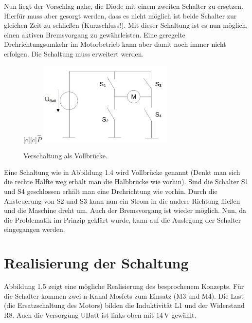 Nun liegt der Vorschlag nahe, die Diode mit einem zweiten Schalter zu ersetzen. Hierfür muss aber gesorgt werden, dass es nicht möglich ist beide Schalter zur gleichen Zeit zu schließen (Kurzschluss!). Mit dieser Schaltung ist es nun möglich, einen aktiven Bremsvorgang zu gewährleisten. Eine geregelte Drehrichtungsumkehr im Motorbetrieb kann aber damit noch immer nicht erfolgen. Die Schaltung muss erweitert werden.

\begin{figure}[H]
	\renewcommand{\figurename}{Abbildung}
	\centering	
	\psfragscanon		
	[c]{$\hat{P}$}
	\includegraphics[width=0.6\textwidth,angle=0]{Bilder/4.jpg}		
	\caption{Verschaltung als Vollbrücke.}
	\label{ME}
\end{figure}

Eine Schaltung wie in Abbildung 1.4 wird Vollbrücke genannt (Denkt man sich die rechte Hälfte weg erhält man die Halbbrücke wie vorhin). Sind die Schalter S1 und S4 geschlossen erhält man eine Drehrichtung wie vorhin. Durch die Ansteuerung von S2 und S3 kann nun ein Strom in die andere Richtung fließen und die Maschine dreht um. Auch der Bremsvorgang ist wieder möglich. Nun, da die Problematik im Prinzip geklärt wurde, kann auf die Auslegung der Schalter eingegangen werden.
\newpage
\section{Realisierung der Schaltung}
\label{Aufbau}

\label{sec_2_3}

Abbildung 1.5 zeigt eine mögliche Realisierung des besprochenem Konzepts. Für die Schalter kommen zwei n-Kanal Mosfets zum Einsatz (M3 und M4). Die Last (die Ersatzschaltung des Motors) bilden die Induktivität L1 und der Widerstand R8. Auch die Versorgung UBatt ist links oben mit 14\,V gewählt.

